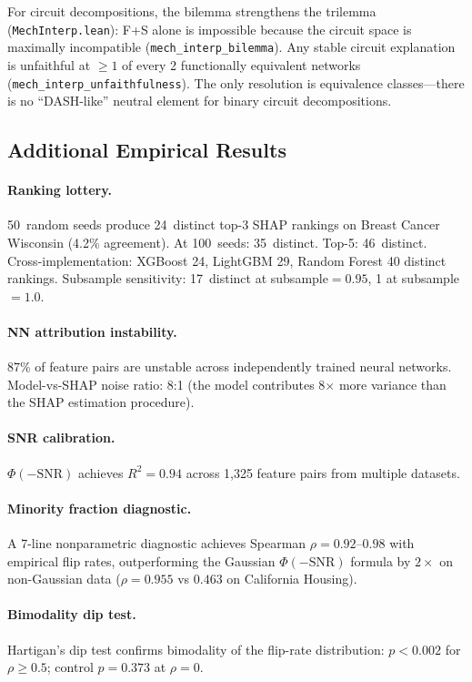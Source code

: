 \documentclass[11pt,a4paper]{article}
\begin{document}
For circuit decompositions, the bilemma strengthens the trilemma (\texttt{MechInterp.lean}): F+S alone is impossible because the circuit space is maximally incompatible (\texttt{mech\_interp\_bilemma}).  Any stable circuit explanation is unfaithful at $\geq 1$ of every 2 functionally equivalent networks (\texttt{mech\_interp\_unfaithfulness}).  The only resolution is equivalence classes---there is no ``DASH-like'' neutral element for binary circuit decompositions.

\subsection{Additional Empirical Results}

\paragraph{Ranking lottery.}
50~random seeds produce 24~distinct top-3 SHAP rankings on Breast Cancer Wisconsin (4.2\% agreement).  At 100~seeds: 35~distinct.  Top-5: 46~distinct.  Cross-implementation: XGBoost 24, LightGBM 29, Random Forest 40 distinct rankings.  Subsample sensitivity: 17~distinct at subsample$= 0.95$, 1 at subsample$= 1.0$.

\paragraph{NN attribution instability.}
87\% of feature pairs are unstable across independently trained neural networks.  Model-vs-SHAP noise ratio: 8:1 (the model contributes 8$\times$ more variance than the SHAP estimation procedure).

\paragraph{SNR calibration.}
$\Phi(-\mathrm{SNR})$ achieves $R^2 = 0.94$ across 1,325 feature pairs from multiple datasets.

\paragraph{Minority fraction diagnostic.}
A 7-line nonparametric diagnostic achieves Spearman $\rho = 0.92$--$0.98$ with empirical flip rates, outperforming the Gaussian $\Phi(-\mathrm{SNR})$ formula by $2\times$ on non-Gaussian data ($\rho = 0.955$ vs $0.463$ on California Housing).

\paragraph{Bimodality dip test.}
Hartigan's dip test confirms bimodality of the flip-rate distribution: $p < 0.002$ for $\rho \geq 0.5$; control $p = 0.373$ at $\rho = 0$.
\end{document}
